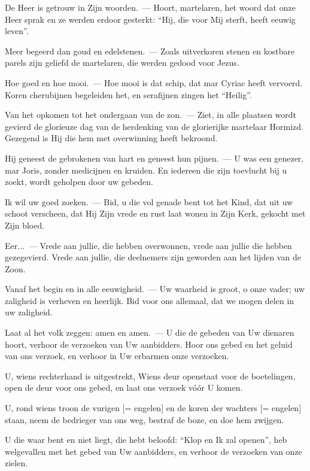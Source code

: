 \documentclass[12pt,twoside,a5paper]{article}
\begin{document}
\begin{halfparskip}
  De Heer is getrouw in Zijn woorden.~--- Hoort, martelaren, het woord dat onze Heer sprak en ze werden erdoor gesterkt: ``Hij, die voor Mij sterft, heeft eeuwig leven''.

  Meer begeerd dan goud en edelstenen.~--- Zoals uitverkoren stenen en kostbare parels zijn geliefd de martelaren, die werden gedood voor Jezus.

  Hoe goed en hoe mooi.~--- Hoe mooi is dat schip, dat mar Cyriac heeft vervoerd. Koren cherubijnen begeleiden het, en serafijnen zingen het ``Heilig''.

  Van het opkomen tot het ondergaan van de zon.~--- Ziet, in alle plaatsen wordt gevierd de glorieuze dag van de herdenking van de glorierijke martelaar Hormizd. Gezegend is Hij die hem met overwinning heeft bekroond.

  Hij geneest de gebrokenen van hart en geneest hun pijnen.~--- U was een genezer, mar Joris, zonder medicijnen en kruiden. En iedereen die zijn toevlucht bij u zoekt, wordt geholpen door uw gebeden.

  Ik wil uw goed zoeken.~--- Bid, u die vol genade bent tot het Kind, dat uit uw schoot verscheen, dat Hij Zijn vrede en rust laat wonen in Zijn Kerk, gekocht met Zijn bloed.

  Eer...~--- Vrede aan jullie, die hebben overwonnen, vrede aan jullie die hebben gezegevierd. Vrede aan jullie, die deelnemers zijn geworden aan het lijden van de Zoon.

  Vanaf het begin en in alle eeuwigheid.~--- Uw waarheid is groot, o onze vader; uw zaligheid is verheven en heerlijk. Bid voor ons allemaal, dat we mogen delen in uw zaligheid.

  Laat al het volk zeggen: amen en amen.~--- U die de gebeden van Uw dienaren hoort, verhoor de verzoeken van Uw aanbidders. Hoor ons gebed en het geluid van ons verzoek, en verhoor in Uw erbarmen onze verzoeken.

  U, wiens rechterhand is uitgestrekt, Wiens deur openstaat voor de boetelingen, open de deur voor ons gebed, en laat ons verzoek vóór U komen.

  U, rond wiens troon de vurigen [= engelen] en de koren der wachters [= engelen] staan, neem de bedrieger van ons weg, bestraf de boze, en doe hem zwijgen.

  U die waar bent en niet liegt, die hebt beloofd: ``Klop en Ik zal openen'', heb welgevallen met het gebed van Uw aanbidders, en verhoor de verzoeken van onze zielen.
\end{halfparskip}
\end{document}
